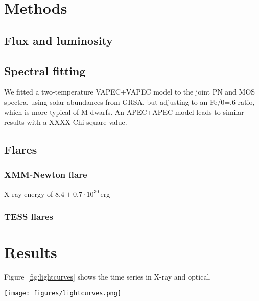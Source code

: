\documentclass[twocolumn]{aastex631}
\begin{document}
\section{Methods}
\label{sec:methods}

\subsection{Flux and luminosity}

\subsection{Spectral fitting}
We fitted a two-temperature VAPEC+VAPEC model to the joint PN and MOS spectra, using solar abundances from GRSA, but adjusting to an Fe/0=.6 ratio, which is more typical of M dwarfs. An APEC+APEC model leads to similar results with a XXXX Chi-square value. 



\subsection{Flares}

\subsubsection{XMM-Newton flare}

X-ray energy of $8.4\pm0.7\cdot10^{30}\,$erg

\subsubsection{TESS flares}

\section{Results}

Figure~\ref{fig:lightcurves} shows the time series in X-ray and optical. 

\begin{figure*}[ht!]
    \begin{centering}
        \texttt{[image: figures/lightcurves.png]}
        \caption{
         Top panel: Optical Monitoring (OM) light curve. Bottom panel: X-ray (PN, MOS1 and MOS2 combined) light curve. 
        }
        \label{fig:lightcurves}
    \end{centering}
\end{figure*}
\end{document}
